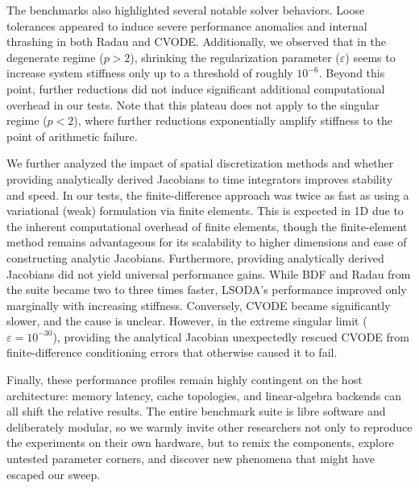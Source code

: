 The benchmarks also highlighted several notable solver behaviors. Loose tolerances appeared to induce severe performance anomalies and internal thrashing in both Radau and CVODE. Additionally, we observed that in the degenerate regime (\(p > 2\)), shrinking the regularization parameter (\(\varepsilon\)) seems to increase system stiffness only up to a threshold of roughly \(10^{-6}\). Beyond this point, further reductions did not induce significant additional computational overhead in our tests. Note that this plateau does not apply to the singular regime (\(p < 2\)), where further reductions exponentially amplify stiffness to the point of arithmetic failure.

We further analyzed the impact of spatial discretization methods and whether providing analytically derived Jacobians to time integrators improves stability and speed. In our tests, the finite-difference approach was twice as fast as using a variational (weak) formulation via finite elements. This is expected in 1D due to the inherent computational overhead of finite elements, though the finite-element method remains advantageous for its scalability to higher dimensions and ease of constructing analytic Jacobians. Furthermore, providing analytically derived Jacobians did not yield universal performance gains. While BDF and Radau from the  suite became two to three times faster, LSODA's performance improved only marginally with increasing stiffness. Conversely, CVODE became significantly slower, and the cause is unclear. However, in the extreme singular limit (\(\varepsilon = 10^{-30}\)), providing the analytical Jacobian unexpectedly rescued CVODE from finite-difference conditioning errors that otherwise caused it to fail.

Finally, these performance profiles remain highly contingent on the host architecture: memory latency, cache topologies, and linear‑algebra backends can all shift the relative results. The entire benchmark suite is libre software and deliberately modular, so we warmly invite other researchers not only to reproduce the experiments on their own hardware, but to remix the components, explore untested parameter corners, and discover new phenomena that might have escaped our sweep.
